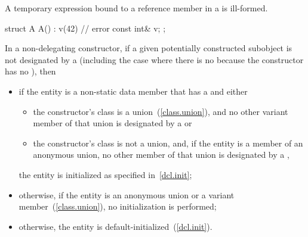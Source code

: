 \pnum
A temporary expression bound to a reference member in a 
is ill-formed.
\enterexample
\begin{codeblock}
struct A {
  A() : v(42) { }  // error
  const int& v;
};
\end{codeblock}
\exitexample

\pnum
In a non-delegating constructor, if
a given potentially constructed subobject is not designated by a
(including the case where there is no
because the constructor has no
),
then

\begin{itemize}
\item if the entity is a non-static data member that has a  and either

\begin{itemize}
\item the constructor's class is a union~(\ref{class.union}), and no other variant
member of that union is designated by a  or

\item the constructor's class is not a union, and, if the entity is a member of an
anonymous union, no other member of that union is designated by a
,
\end{itemize}

the entity is initialized as specified in~\ref{dcl.init};

\item otherwise, if the entity is an anonymous union or a variant member~(\ref{class.union}), no initialization is performed;

\item otherwise, the entity is default-initialized~(\ref{dcl.init}).
\end{itemize}

